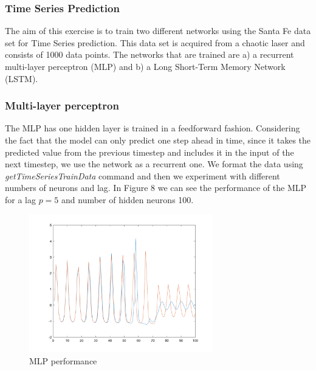 \documentclass[11pt,conference,compsoc]{IEEEtran}
\begin{document}
\subsubsection{Time Series Prediction}
The aim of this exercise is to train two different networks using the Santa Fe data set for Time Series prediction. This data set is acquired from a chaotic laser and consists of 1000 data points. The networks that are trained are a) a recurrent multi-layer perceptron (MLP) and b) a Long Short-Term Memory Network (LSTM).   
\subsubsection{Multi-layer perceptron}
The MLP has one hidden layer is trained in a feedforward fashion. Considering the fact that the model can only predict one step ahead in time, since it takes the predicted value from the previous timestep and includes it in the input of the next timestep, we use the network as a recurrent one. We format the data using \textit{getTimeSeriesTrainData} command and then we experiment with different numbers of neurons and lag. In Figure 8 we can see the performance of the MLP for a lag $p = 5$ and number of hidden neurons 100.

\begin{figure}[h!]
    \centering
    \includegraphics[width=8cm]{images/mlp_perf.png}
    \caption{MLP performance}
    \label{fig:8}
\end{figure}
\end{document}
